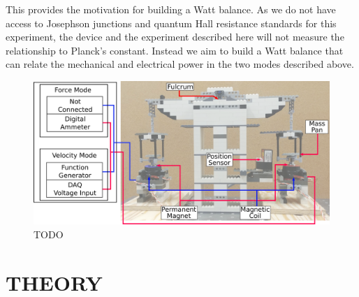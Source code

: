 \documentclass[aps,prstab,reprint,12pt]{revtex4-1}
\begin{document}

This provides the motivation for building a Watt balance. As we do not have access to Josephson junctions and quantum Hall resistance standards for this experiment, the device and the experiment described here will not measure the relationship to Planck's constant. Instead we aim to build a Watt balance that can relate the mechanical and electrical power in the two modes described above.


\begin{figure}
    \centering
    \includegraphics[width=0.95\linewidth]{figs/watt_balance.png}
    \caption{TODO}
    \label{fig:device_image}
\end{figure}


\section{THEORY}\label{s:theory}
\end{document}
